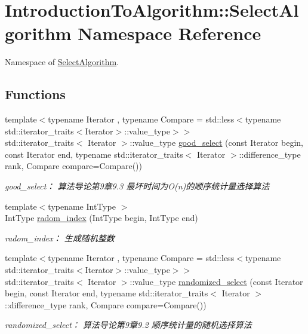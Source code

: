 \hypertarget{namespace_introduction_to_algorithm_1_1_select_algorithm}{}\section{Introduction\+To\+Algorithm\+:\+:Select\+Algorithm Namespace Reference}
\label{namespace_introduction_to_algorithm_1_1_select_algorithm}


Namespace of \hyperlink{namespace_introduction_to_algorithm_1_1_select_algorithm}{Select\+Algorithm}.  


\subsection*{Functions}
\begin{DoxyCompactItemize}
\item 
{\footnotesize template$<$typename Iterator , typename Compare  = std\+::less$<$typename std\+::iterator\+\_\+traits$<$\+Iterator$>$\+::value\+\_\+type$>$$>$ }\\std\+::iterator\+\_\+traits$<$ Iterator $>$\+::value\+\_\+type \hyperlink{namespace_introduction_to_algorithm_1_1_select_algorithm_a657864bac0e9aae7bedb7cde85ac5576}{good\+\_\+select} (const Iterator begin, const Iterator end, typename std\+::iterator\+\_\+traits$<$ Iterator $>$\+::difference\+\_\+type rank, Compare compare=Compare())
\begin{DoxyCompactList}\small\item\em good\+\_\+select： 算法导论第9章9.3 最坏时间为\+O(n)的顺序统计量选择算法 \end{DoxyCompactList}\item 
{\footnotesize template$<$typename Int\+Type $>$ }\\Int\+Type \hyperlink{namespace_introduction_to_algorithm_1_1_select_algorithm_a117ee8d5d70d91c5be1d412f9fbad1cd}{radom\+\_\+index} (Int\+Type begin, Int\+Type end)
\begin{DoxyCompactList}\small\item\em radom\+\_\+index： 生成随机整数 \end{DoxyCompactList}\item 
{\footnotesize template$<$typename Iterator , typename Compare  = std\+::less$<$typename std\+::iterator\+\_\+traits$<$\+Iterator$>$\+::value\+\_\+type$>$$>$ }\\std\+::iterator\+\_\+traits$<$ Iterator $>$\+::value\+\_\+type \hyperlink{namespace_introduction_to_algorithm_1_1_select_algorithm_a395bd75c7fea69efc84be89a00b9463c}{randomized\+\_\+select} (const Iterator begin, const Iterator end, typename std\+::iterator\+\_\+traits$<$ Iterator $>$\+::difference\+\_\+type rank, Compare compare=Compare())
\begin{DoxyCompactList}\small\item\em randomized\+\_\+select： 算法导论第9章9.2 顺序统计量的随机选择算法 \end{DoxyCompactList}\end{DoxyCompactItemize}


